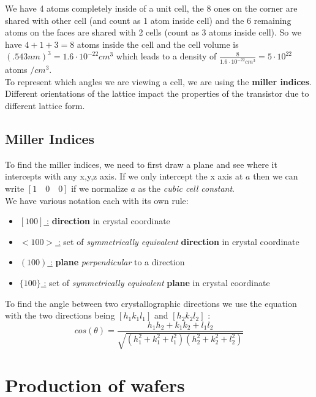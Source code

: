\documentclass{report}
\begin{document}
We have 4 atoms completely inside of a unit cell, the 8 ones on the corner are shared with other cell (and count as 1 atom inside cell) and the 6 remaining atoms on the faces are shared with 2 cells (count as 3 atoms inside cell). So we have $4+1+3=8$ atoms inside the cell and the cell volume is $(.543 nm)^3 = 1.6 \cdot10^{-22} cm^3$ which leads to a density of $\frac{8}{1.6 \cdot10^{-22} cm^3} = 5 \cdot 10^{22}$ atoms $/cm^3$.\\
To represent which angles we are viewing a cell, we are using the \textbf{miller indices}. Different orientations of the lattice impact the properties of the transistor due to different lattice form.

\subsection{Miller Indices}

To find the miller indices, we need to first draw a plane and see where it intercepts with any x,y,z axis. If we only intercept the x axis at $a$ then we can write $[1 \quad 0 \quad 0]$ if we normalize $a$ as the \textit{cubic cell constant}.\\
We have various notation each with its own rule:

\begin{itemize}
    \item \underline{$[100]$ :} \textbf{direction} in crystal coordinate
    \item \underline{$<100>$ :} set of \textit{symmetrically equivalent} \textbf{direction} in crystal coordinate
    \item \underline{$(100)$ :} \textbf{plane} \textit{perpendicular} to a direction
    \item \underline{$\{100\}$ :} set of \textit{symmetrically equivalent} \textbf{plane} in crystal coordinate
\end{itemize}

To find the angle between two crystallographic directions we use the equation with the two directions being $[h_1k_1l_1]$ and $[h_2k_2l_2]$ : 
\begin{equation}
    cos(\theta) = \frac{h_1 h_2+k_1k_2+l_1l_2}{\sqrt{(h_1^2+k_1^2+l_1^2)(h_2^2+k_2^2+l_2^2)}}
\end{equation}


\section{Production of wafers}
\end{document}
